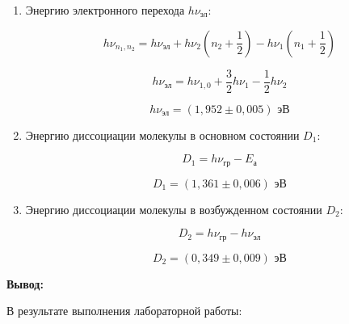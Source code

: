 \documentclass[a4paper, 12pt]{article}%
\begin{document}
\begin{enumerate}
\begin{enumerate}

    \item Энергию электронного перехода $h \nu_{\text{эл}}$:
	    
		\[h \nu_{n_1, n_2} = h\nu_{\text{эл}} + h \nu_2 \left( n_2 + \dfrac{1}{2} \right) - h \nu_1 \left( n_1 + \dfrac{1}{2} \right)\]
    
		\[h \nu_{\text{эл}} = h \nu_{1, 0} + \dfrac{3}{2} h \nu_1 - \dfrac{1}{2} h \nu_2 \]
    
		\[h \nu_{\text{эл}} = (1,952 \pm 0,005) \text{ эВ}\]
		
    \item Энергию диссоциации молекулы в основном состоянии $D_1$:
    
    \[D_1 = h \nu_{\text{гр}} - E_{\text{а}}\]
    
    \[D_1 = (1,361 \pm 0,006) \text{ эВ}\]
    
    \item Энергию диссоциации молекулы в возбужденном состоянии $D_2$:
    
    \[D_2 = h \nu_{\text{гр}} - h \nu_{\text{эл}}\]
    
    \[D_2 = (0,349 \pm 0,009) \text{ эВ}\]
    
\end{enumerate}

\end{enumerate}

\textbf{Вывод:}\\\par

В результате выполнения лабораторной работы:
\end{document}
